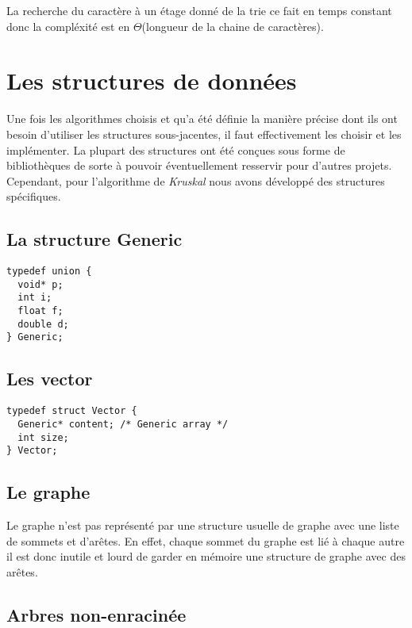 \documentclass[a4paper]{article}
\begin{document}
\medskip

La recherche du caractère à un étage donné de la trie ce fait en temps constant donc la compléxité est en $\Theta$(longueur de la chaine de caractères).

\section{Les structures de données}
\label{se:structures}

Une fois les algorithmes choisis et qu'a été définie la manière précise dont ils ont besoin d'utiliser les structures sous-jacentes, il faut effectivement les choisir et les implémenter. La plupart des structures ont été conçues sous forme de bibliothèques de sorte à pouvoir éventuellement resservir pour d'autres projets. Cependant, pour l'algorithme de \emph{Kruskal} nous avons développé des structures spécifiques.

\subsection{La structure Generic}

\begin{verbatim}
typedef union {
  void* p;
  int i;
  float f;
  double d;
} Generic;
\end{verbatim}

\subsection{Les vector}


\begin{verbatim}
typedef struct Vector {
  Generic* content; /* Generic array */
  int size;
} Vector;
\end{verbatim}

\subsection{Le graphe}

Le graphe n'est pas représenté par une structure usuelle de graphe avec une liste de sommets et d'arêtes. En effet, chaque sommet du graphe est lié à chaque autre il est donc inutile et lourd de garder en mémoire une structure de graphe avec des arêtes.

\subsection{Arbres non-enracinée}
\end{document}
